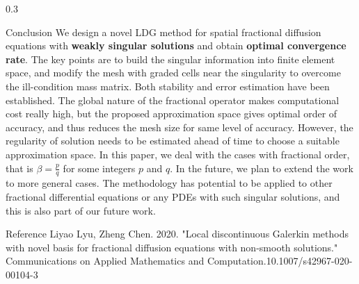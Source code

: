 \documentclass{msuposter}
\newcommand{\colwidth}{0.3\linewidth}
\begin{document}
\begin{frame}{}
\begin{columns}[t]
\begin{column}{\colwidth}
\begin{block}{Conclusion}
We design a novel LDG method for spatial fractional diffusion equations with \textbf{weakly singular solutions} and obtain \textbf{optimal convergence rate}.
The key points are to build the singular information into finite element space, and modify the mesh with graded cells near the singularity to overcome the ill-condition mass matrix. 
Both stability and error estimation have been established. 
The global nature of the fractional operator makes computational cost really high, but the proposed approximation space gives optimal order of accuracy, and thus reduces the mesh size for same level of accuracy. 
However, the regularity of solution needs to be estimated ahead of time to choose a suitable approximation space.
In this paper, we deal with the cases with fractional order, that is $\beta  = \frac{p}{q}$ for some integers $p$ and $q$.  
In the future, we plan to extend the work to more general cases.   
The methodology has potential to be applied to other fractional differential equations or any PDEs with such singular solutions, and this is also part of our future work. 
\end{block}
\begin{block}{Reference}
Liyao Lyu, Zheng Chen. 2020. "Local discontinuous Galerkin methods with novel basis for fractional diffusion equations with non-smooth solutions."  Communications on Applied Mathematics and Computation.10.1007/s42967-020-00104-3
\end{block}
\end{column}
\end{columns}	
\end{frame}
\end{document}
